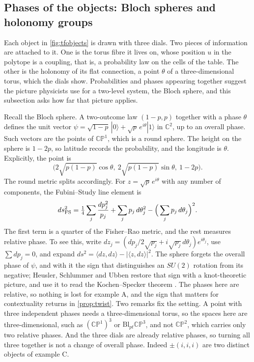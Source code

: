 \documentclass[11pt]{article}
\theoremstyle{definition}\newtheorem{definition}[theorem]{Definition}\newtheorem{remark}[theorem]{Remark}\newtheorem{example}[theorem]{Example}\newtheorem{problem}[theorem]{Open problem}\crefname{problem}{Problem}{Problems}
\begin{document}
\subsection{Phases of the objects: Bloch spheres and holonomy groups}\label{sec:bloch}
Each object in \cref{fig:tfobjects} is drawn with three dials. Two pieces of information are attached to it. One is the torus fibre it lives on, whose position $u$ in the polytope is a coupling, that is, a probability law on the cells of the table. The other is the holonomy of its flat connection, a point $\theta$ of a three-dimensional torus, which the dials show. Probabilities and phases appearing together suggest the picture physicists use for a two-level system, the Bloch sphere, and this subsection asks how far that picture applies.

Recall the Bloch sphere. A two-outcome law $(1-p,p)$ together with a phase $\theta$ defines the unit vector $\psi=\sqrt{1-p}\,|0\rangle+\sqrt p\,e^{i\theta}|1\rangle$ in $\mathbb C^2$, up to an overall phase. Such vectors are the points of $\mathbb{CP}^1$, which is a round sphere. The height on the sphere is $1-2p$, so latitude records the probability, and the longitude is $\theta$. Explicitly, the point is
\[
\big(2\sqrt{p(1-p)}\cos\theta,\ 2\sqrt{p(1-p)}\sin\theta,\ 1-2p\big).
\]
The round metric splits accordingly. For $z=\sqrt p\,e^{i\theta}$ with any number of components, the Fubini--Study line element is
\[
ds^2_{\rm FS}=\tfrac14\sum_j\frac{dp_j^2}{p_j}+\sum_jp_j\,d\theta_j^2-\Big(\sum_jp_j\,d\theta_j\Big)^2 .
\]
The first term is a quarter of the Fisher--Rao metric, and the rest measures relative phase. To see this, write $dz_j=(dp_j/2\sqrt{p_j}+i\sqrt{p_j}\,d\theta_j)e^{i\theta_j}$, use $\sum dp_j=0$, and expand $ds^2=\langle dz,dz\rangle-|\langle z,dz\rangle|^2$. The sphere forgets the overall phase of $\psi$, and with it the sign that distinguishes an $SU(2)$ rotation from its negative; Heusler, Schlummer and Ubben restore that sign with a knot-theoretic picture, and use it to read the Kochen--Specker theorem \cite{HeuslerSchlummerUbben2020}. The phases here are relative, so nothing is lost for example A, and the sign that matters for contextuality returns in \cref{prop:twist}. Two remarks fix the setting. A point with three independent phases needs a three-dimensional torus, so the spaces here are three-dimensional, such as $(\mathbb{CP}^1)^3$ or $\mathrm{Bl}_{pt}\mathbb{CP}^3$, and not $\mathbb{CP}^2$, which carries only two relative phases. And the three dials are already relative phases, so turning all three together is not a change of overall phase. Indeed $\pm(i,i,i)$ are two distinct objects of example C.
\end{document}
